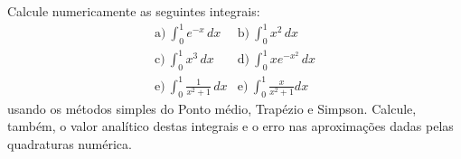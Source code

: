 \begin{Exercise}Calcule numericamente as seguintes integrais:
  \begin{eqnarray*}
    \text{a)}~\int_0^1e^{-x}\,dx & \text{b)}~\int_0^1x^2\,dx\\
    \text{c)}~\int_0^1x^3\,dx & \text{d)}~\int_0^1xe^{-x^2}\,dx\\
    \text{e)}~\int_0^1\frac{1}{x^2+1}\,dx &\text{e)}~\int_0^1\frac{x}{x^2+1}dx 
  \end{eqnarray*}
usando os métodos simples do Ponto médio, Trapézio e Simpson. Calcule, também, o valor analítico destas integrais e o erro nas aproximações dadas pelas quadraturas numérica.
\end{Exercise}


